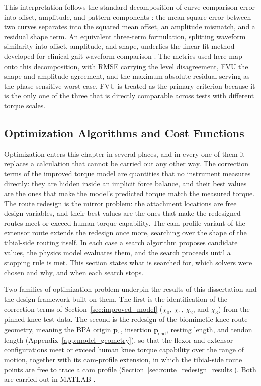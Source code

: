 This interpretation follows the standard decomposition of curve-comparison error into offset, amplitude, and pattern components \citep{taylor_summarizing_2001}: the mean square error between two curves separates into the squared mean offset, an amplitude mismatch, and a residual shape term. An equivalent three-term formulation, splitting waveform similarity into offset, amplitude, and shape, underlies the linear fit method developed for clinical gait waveform comparison \citep{iosa_assessment_2014}. The metrics used here map onto this decomposition, with RMSE carrying the level disagreement, FVU the shape and amplitude agreement, and the maximum absolute residual serving as the phase-sensitive worst case. FVU is treated as the primary criterion because it is the only one of the three that is directly comparable across tests with different torque scales.

\subsection{Optimization Algorithms and Cost Functions}\label{sec:optimization}

Optimization enters this chapter in several places, and in every one of them it replaces a calculation that cannot be carried out any other way. The correction terms of the improved torque model are quantities that no instrument measures directly: they are hidden inside an implicit force balance, and their best values are the ones that make the model's predicted torque match the measured torque. The route redesign is the mirror problem: the attachment locations are free design variables, and their best values are the ones that make the redesigned routes meet or exceed human torque capability. The cam-profile variant of the extensor route extends the redesign once more, searching over the shape of the tibial-side routing itself. In each case a search algorithm proposes candidate values, the physics model evaluates them, and the search proceeds until a stopping rule is met. This section states what is searched for, which solvers were chosen and why, and when each search stops.

Two families of optimization problem underpin the results of this dissertation and the design framework built on them. The first is the identification of the correction terms of Section~\ref{sec:improved_model} ($\chi_{0}$, $\chi_{1}$, $\chi_{2}$, and $\chi_{3}$) from the pinned-knee test data. The second is the redesign of the biomimetic knee route geometry, meaning the BPA origin $\mathbf{p}_{1}$, insertion $\mathbf{p}_{\text{end}}$, resting length, and tendon length (Appendix~\ref{app:model_geometry}), so that the flexor and extensor configurations meet or exceed human knee torque capability over the range of motion, together with its cam-profile extension, in which the tibial-side route points are free to trace a cam profile (Section~\ref{sec:route_redesign_results}). Both are carried out in MATLAB \citep{mathworks_optimization_2025}.

